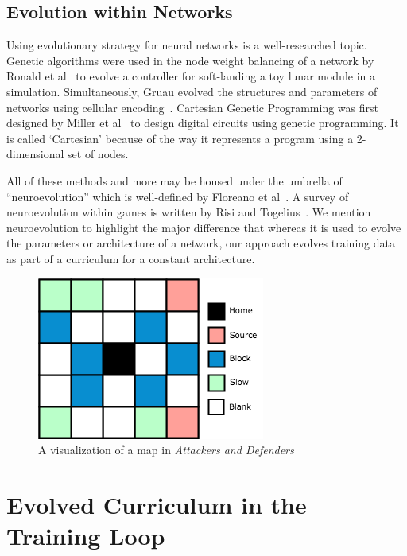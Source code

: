 \documentclass[letterpaper]{article} %
\begin{document}
\subsection{Evolution within Networks}
Using evolutionary strategy for neural networks is a well-researched topic. Genetic algorithms were used in the node weight balancing of a network by Ronald et al~\cite{ronald1994genetic} to evolve a controller for soft-landing a toy lunar module in a simulation. Simultaneously, Gruau evolved the structures and parameters of networks using cellular encoding~\cite{gruau1994neural}. Cartesian Genetic Programming was first designed by Miller et al~\cite{miller1997designing} to design digital circuits using genetic programming. It is called `Cartesian' because of the way it represents a program using a 2-dimensional set of nodes.

All of these methods and more may be housed under the umbrella of ``neuroevolution'' which is well-defined by Floreano et al~\cite{floreano2008neuroevolution}. A survey of neuroevolution within games is written by Risi and Togelius~\cite{risi2017neuroevolution}. We mention neuroevolution to highlight the major difference that whereas it is used to evolve the parameters or architecture of a network, our approach evolves training data as part of a curriculum for a constant architecture.

\begin{figure}
\includegraphics[width=\linewidth]{graphics/map-rep-1.png}
\caption{A visualization of a map in \textit{Attackers and Defenders}}
\label{fig:map-rep}
\end{figure}

\section{Evolved Curriculum in the Training Loop}\label{sec:theory}
\end{document}
